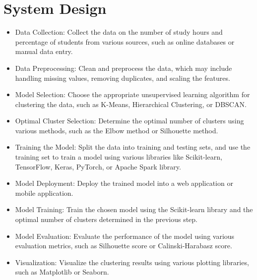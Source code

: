 \chapter{System Design}
\justify
\quad 
\begin{itemize}
    \item Data Collection: Collect the data on the number of study hours and percentage of students from various sources, such as online databases or manual data entry.
    \item Data Preprocessing: Clean and preprocess the data, which may include handling missing values, removing duplicates, and scaling the features.
    \item Model Selection: Choose the appropriate unsupervised learning algorithm for clustering the data, such as K-Means, Hierarchical Clustering, or DBSCAN.
    \item Optimal Cluster Selection: Determine the optimal number of clusters using various methods, such as the Elbow method or Silhouette method.
    \item Training the Model: Split the data into training and testing sets, and use the training set to train a model using various libraries like Scikit-learn, TensorFlow, Keras, PyTorch, or Apache Spark  library.
    \item Model Deployment: Deploy the trained model into a web application or mobile application.
    \item Model Training: Train the chosen model using the Scikit-learn library and the optimal number of clusters determined in the previous step.
    \item Model Evaluation: Evaluate the performance of the model using various evaluation metrics, such as Silhouette score or Calinski-Harabasz score.
    \item Visualization: Visualize the clustering results using various plotting libraries, such as Matplotlib or Seaborn.
\end{itemize}
